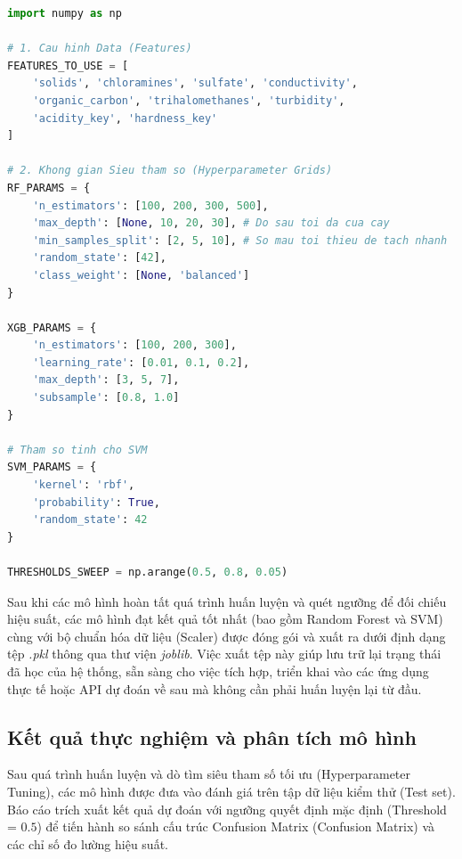 \begin{lstlisting}[language=Python, caption=Cấu hình đặc trưng và không gian siêu tham số cho các mô hình]
import numpy as np

# 1. Cau hinh Data (Features)
FEATURES_TO_USE = [
    'solids', 'chloramines', 'sulfate', 'conductivity',
    'organic_carbon', 'trihalomethanes', 'turbidity',
    'acidity_key', 'hardness_key'  
]

# 2. Khong gian Sieu tham so (Hyperparameter Grids)
RF_PARAMS = {
    'n_estimators': [100, 200, 300, 500],
    'max_depth': [None, 10, 20, 30], # Do sau toi da cua cay
    'min_samples_split': [2, 5, 10], # So mau toi thieu de tach nhanh
    'random_state': [42],
    'class_weight': [None, 'balanced'] 
}

XGB_PARAMS = {
    'n_estimators': [100, 200, 300],
    'learning_rate': [0.01, 0.1, 0.2],
    'max_depth': [3, 5, 7],
    'subsample': [0.8, 1.0]
}

# Tham so tinh cho SVM
SVM_PARAMS = {
    'kernel': 'rbf',
    'probability': True,
    'random_state': 42
}

THRESHOLDS_SWEEP = np.arange(0.5, 0.8, 0.05) 
\end{lstlisting}
Sau khi các mô hình hoàn tất quá trình huấn luyện và quét ngưỡng để đối chiếu hiệu suất, các mô hình đạt kết quả tốt nhất (bao gồm Random Forest và SVM) cùng với bộ chuẩn hóa dữ liệu (Scaler) được đóng gói và xuất ra dưới định dạng tệp \textit{.pkl} thông qua thư viện \textit{joblib}. Việc xuất tệp này giúp lưu trữ lại trạng thái đã học của hệ thống, sẵn sàng cho việc tích hợp, triển khai vào các ứng dụng thực tế hoặc API dự đoán về sau mà không cần phải huấn luyện lại từ đầu.
\subsection{Kết quả thực nghiệm và phân tích mô hình}
Sau quá trình huấn luyện và dò tìm siêu tham số tối ưu (Hyperparameter Tuning), các mô hình được đưa vào đánh giá trên tập dữ liệu kiểm thử (Test set). Báo cáo trích xuất kết quả dự đoán với ngưỡng quyết định mặc định (Threshold = $0.5$) để tiến hành so sánh cấu trúc Confusion Matrix (Confusion Matrix) và các chỉ số đo lường hiệu suất.

